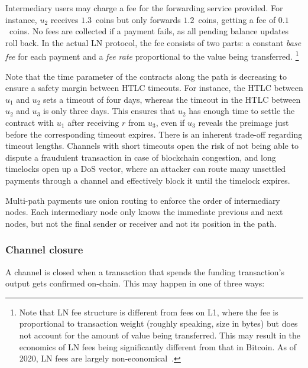 Intermediary users may charge a fee for the forwarding service provided. 
For instance, $u_2$ receives $1.3$~coins but only forwards $1.2$~coins, getting a fee of $0.1$~coins.
No fees are collected if a payment fails, as all pending balance updates roll back.
In the actual LN protocol, the fee consists of two parts: a constant \textit{base fee} for each payment and a \textit{fee rate} proportional to the value being transferred.
\footnote{Note that LN fee structure is different from fees on L1, where the fee is proportional to transaction weight (roughly speaking, size in bytes) but does not account for the amount of value being transferred. This may result in the economics of LN fees being significantly different from that in Bitcoin. As of 2020, LN fees are largely non-economical~\cite{Beres2019}.}

Note that the time parameter of the contracts along the path is decreasing to ensure a safety margin between HTLC timeouts.
For instance, the HTLC between $u_1$ and $u_2$ sets a timeout of four days, whereas the timeout in the HTLC between $u_2$ and $u_3$ is only three days.
This ensures that $u_2$ has enough time to settle the contract with $u_1$ after receiving $r$ from $u_3$, even if $u_3$ reveals the preimage just before the corresponding timeout expires.
There is an inherent trade-off regarding timeout lengths.
Channels with short timeouts open the risk of not being able to dispute a fraudulent transaction in case of blockchain congestion, and long timelocks open up a DoS vector, where an attacker can route many unsettled payments through a channel and effectively block it until the timelock expires.

Multi-path payments use onion routing to enforce the order of intermediary nodes.
Each intermediary node only knows the immediate previous and next nodes, but not the final sender or receiver and not its position in the path.


\subsubsection*{Channel closure}

A channel is closed when a transaction that spends the funding transaction's output gets confirmed on-chain.
This may happen in one of three ways:

